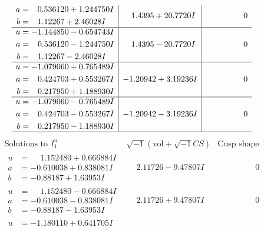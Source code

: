 \documentclass[1p]{elsarticle_modified}
\theoremstyle{definition}
\newcommand{\I}{\sqrt{-1}}
\begin{document}
$$\begin{array}{c|c|c}
\begin{aligned}
a &= \phantom{-}0.536120 + 1.244750 I \\
b &= \phantom{-}1.12267 + 2.46028 I\end{aligned}
 & \phantom{-}1.4395 + 20.7720 I & \phantom{-0.000000 } 0 \\ \hline\begin{aligned}
u &= -1.144850 - 0.654743 I \\
a &= \phantom{-}0.536120 - 1.244750 I \\
b &= \phantom{-}1.12267 - 2.46028 I\end{aligned}
 & \phantom{-}1.4395 - 20.7720 I & \phantom{-0.000000 } 0 \\ \hline\begin{aligned}
u &= -1.079060 + 0.765489 I \\
a &= \phantom{-}0.424703 + 0.553267 I \\
b &= \phantom{-}0.217950 + 1.188930 I\end{aligned}
 & -1.20942 + 3.19236 I & \phantom{-0.000000 } 0 \\ \hline\begin{aligned}
u &= -1.079060 - 0.765489 I \\
a &= \phantom{-}0.424703 - 0.553267 I \\
b &= \phantom{-}0.217950 - 1.188930 I\end{aligned}
 & -1.20942 - 3.19236 I & \phantom{-0.000000 } 0\\
 \hline 
 \end{array}$$\newpage$$\begin{array}{c|c|c}  
\text{Solutions to }I^u_{1}& \I (\text{vol} + \sqrt{-1}CS) & \text{Cusp shape}\\
 \hline 
\begin{aligned}
u &= \phantom{-}1.152480 + 0.666884 I \\
a &= -0.610038 + 0.838081 I \\
b &= -0.88187 + 1.63953 I\end{aligned}
 & \phantom{-}2.11726 - 9.47807 I & \phantom{-0.000000 } 0 \\ \hline\begin{aligned}
u &= \phantom{-}1.152480 - 0.666884 I \\
a &= -0.610038 - 0.838081 I \\
b &= -0.88187 - 1.63953 I\end{aligned}
 & \phantom{-}2.11726 + 9.47807 I & \phantom{-0.000000 } 0 \\ \hline\begin{aligned}
u &= -1.180110 + 0.641705 I \\

\end{aligned}
\end{array}$$
\end{document}
